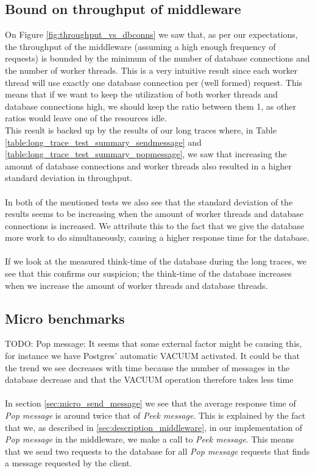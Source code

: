 \documentclass{article}
\begin{document}
\begin{table}
\begin{tabular}
        \subsection{Bound on throughput of middleware}
            \label{sec:analysis_bound_on_throughput}
            On Figure \ref{fig:throughput_vs_dbconns} we saw that, as per our expectations, the throughput of the middleware (assuming a high enough frequency of requests) is bounded by the minimum of the number of database connections and the number of worker threads. This is a very intuitive result since each worker thread will use exactly one database connection per (well formed) request. This means that if we want to keep the utilization of both worker threads and database connections high, we should keep the ratio between them 1, as other ratios would leave one of the resources idle.\\
            This result is backed up by the results of our long traces where, in Table \ref{table:long_trace_test_summary_sendmessage} and \ref{table:long_trace_test_summary_popmessage}, we saw that increasing the amount of database connections and worker threads also resulted in a higher standard deviation in throughput.\\
            \\
            In both of the mentioned tests we also see that the standard deviation of the results seems to be increasing when the amount of worker threads and database connections is increased. We attribute this to the fact that we give the database more work to do simultaneously, causing a higher response time for the database.\\
            \\
            If we look at the measured think-time of the database during the long traces, we see that this confirms our suspicion; the think-time of the database increases when we increase the amount of worker threads and database threads.

        \subsection{Micro benchmarks}
            \label{sec:analysis_micro_benchmarks}
            TODO: Pop message: It seems that some external factor might be causing this, for instance we have Postgres' automatic VACUUM activated. It could be that the trend we see decreases with time because the number of messages in the database decrease and that the VACUUM operation therefore takes less time\\
            \\
            In section \ref{sec:micro_send_message} we see that the average response time of \textit{Pop message} is around twice that of \textit{Peek message}. This is explained by the fact that we, as described in \ref{sec:description_middleware}, in our implementation of \textit{Pop message} in the middleware, we make a call to \textit{Peek message}. This means that we send two requests to the database for all \textit{Pop message} requests that finds a message requested by the client. 


\end{tabular}
\end{table}
\end{document}
